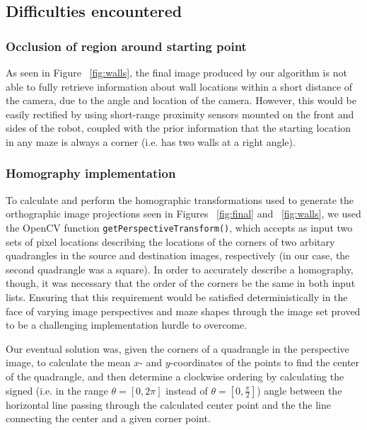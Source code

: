 \documentclass[10pt,twocolumn,letterpaper]{article}
\begin{document}
\subsection{Difficulties encountered}
\label{sub:difficulties}

\subsubsection{Occlusion of region around starting point} %
\label{ssub:occlusion_of_region_around_starting_point}

As seen in Figure ~\ref{fig:walls}, the final image produced by our algorithm is not able to fully retrieve information
about wall locations within a short distance of the camera, due to the angle and location of the camera.  However, this
would be easily rectified by using short-range proximity sensors mounted on the front and sides of the robot, coupled
with the prior information that the starting location in any maze is always a corner (i.e. has two walls at a right
angle).

\subsubsection{Homography implementation} %
\label{ssub:homography_implementation}

To calculate and perform the homographic transformations used to generate the orthographic image projections seen in
Figures ~\ref{fig:final} and ~\ref{fig:walls}, we used the OpenCV function \texttt{getPerspectiveTransform()}, which
accepts as input two sets of pixel locations describing the locations of the corners of two arbitary quadrangles in the
source and destination images, respectively (in our case, the second quadrangle was a square).  In order to accurately
describe a homography, though, it was necessary that the order of the corners be the same in both input lists.  Ensuring
that this requirement would be satisfied deterministically in the face of varying image perspectives and maze shapes
through the image set proved to be a challenging implementation hurdle to overcome.

Our eventual solution was, given the corners of a quadrangle in the perspective image, to calculate the mean $x$- and
$y$-coordinates of the points to find the center of the quadrangle, and then determine a clockwise ordering by
calculating the signed (i.e. in the range $\theta = [0, 2\pi]$ instead of $\theta = [0, \frac{\pi}{2}]$) angle between
the horizontal line passing through the calculated center point and the the line connecting the center and a given
corner point.
\end{document}
